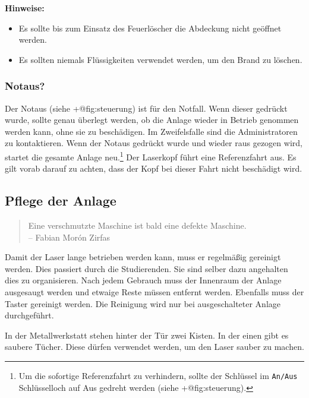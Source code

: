 \documentclass[]{article}
\providecommand{\tightlist}{%
  \setlength{\itemsep}{0pt}\setlength{\parskip}{0pt}}
\begin{document}
\textbf{Hinweise:}

\begin{itemize}
\tightlist
\item
  Es sollte bis zum Einsatz des Feuerlöscher die Abdeckung nicht
  geöffnet werden.\\
\item
  Es sollten niemals Flüssigkeiten verwendet werden, um den Brand zu
  löschen.
\end{itemize}

\hypertarget{notaus}{%
\subsubsection{Notaus?}\label{notaus}}

Der Notaus (siehe +@fig:steuerung) ist für den Notfall. Wenn dieser
gedrückt wurde, sollte genau überlegt werden, ob die Anlage wieder in
Betrieb genommen werden kann, ohne sie zu beschädigen. Im Zweifelsfalle
sind die Administratoren zu kontaktieren. Wenn der Notaus gedrückt wurde
und wieder raus gezogen wird, startet die gesamte Anlage neu.\footnote{Um
  die sofortige Referenzfahrt zu verhindern, sollte der Schlüssel im
  \texttt{An/Aus} Schlüsselloch auf Aus gedreht werden (siehe
  +@fig:steuerung).} Der Laserkopf führt eine Referenzfahrt aus. Es gilt
vorab darauf zu achten, dass der Kopf bei dieser Fahrt nicht beschädigt
wird.

\hypertarget{pflege-der-anlage}{%
\subsection{Pflege der Anlage}\label{pflege-der-anlage}}

\begin{quote}
Eine verschmutzte Maschine ist bald eine defekte Maschine.\\
-- Fabian Morón Zirfas
\end{quote}

Damit der Laser lange betrieben werden kann, muss er regelmäßig
gereinigt werden. Dies passiert durch die Studierenden. Sie sind selber
dazu angehalten dies zu organisieren. Nach jedem Gebrauch muss der
Innenraum der Anlage ausgesaugt werden und etwaige Reste müssen entfernt
werden. Ebenfalls muss der Taster gereinigt werden. Die Reinigung wird
nur bei ausgeschalteter Anlage durchgeführt.

In der Metallwerkstatt stehen hinter der Tür zwei Kisten. In der einen
gibt es saubere Tücher. Diese dürfen verwendet werden, um den Laser
sauber zu machen.
\end{document}
